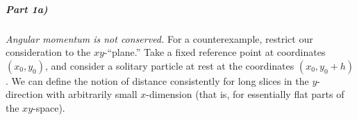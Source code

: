 \begin{comment}
We will assume that in the cylindrical the speed of light is still equal to $c$ in all initial reference frames. However, as we will see, it is not necessarily true anymore that the any two initial reference are identical.  \par 
In this universe, sending out a light pulse simultaneously will result in it coming back from both the $+x$ and the $-x$ direction, after two different time intervals $T_+$ and $T_-$. It is easy to see conceptually how such an asymmetry can arise in a cylindrical universe. Suppose our base ship is moving at some velocity $u$ in the $+x$ direction and sends out a light pulse at some time $t_0$. Since $c$ is finite, the ship will continue to travel in the $+x$ direction while the light travels all the way around. However, because of that, the light that was sent in the $-x$ direction will meet the ship earlier than the light sent into the $+x$ direction (since it had to travel less and both light pulses move at the same speed). \par 
A perhaps easier and more intuitive way to think about this is to recall the use of simultaneity of events in inertial reference frames: Given some local spacetime event in our initial reference frame, all those events are simultaneous which would be reached by a light pulse emitted directly at the original spacetime event. Thus at any given instant, our ship is simultaneous with a copy of itself, whose internal clock has already advanced by $T_+$ and is located at a distance of $T_+c$ in the $+x$ direction and another copy of itself whose internal clock has advanced by $T_-$ located a distance of $T_-$ in the $-x$ direction. \par 
The analysis of the twin paradox becomes now rather routine: Suppose we are sending out a probe in the $+x$ direction. Then, to reach the ship in the positive $x$ direction, the probe has to move a distance of $T_+c$. Due to length contraction, according to a clock on the probe, the journey takes a total time of \[t=\frac{T_+c}{v\gamma} = T_+\sqrt{c^2/v^2-1}\], on the other hand, seen from the copy of the ship at $x=T_+x$, the probe is emitted by the ship in the middle, when the internal clock of the "copy" has already advanced by $T_+$. Thus the time as seen in the frame of the ship is given by
\[ t_s = T_+(1+\frac{c}{v}) \]
\end{comment}

\subparagraph*{Part 1a)}

\emph{Angular momentum is not conserved.}  For a counterexample, restrict our consideration to the $xy$-``plane.''  Take a fixed reference point at coordinates $(x_0, y_0)$, and consider a solitary particle at rest at the coordinates $(x_0, y_0 + h)$.  We can define the notion of distance consistently for long slices in the $y$-direction with arbitrarily small $x$-dimension (that is, for essentially flat parts of the $xy$-space).

